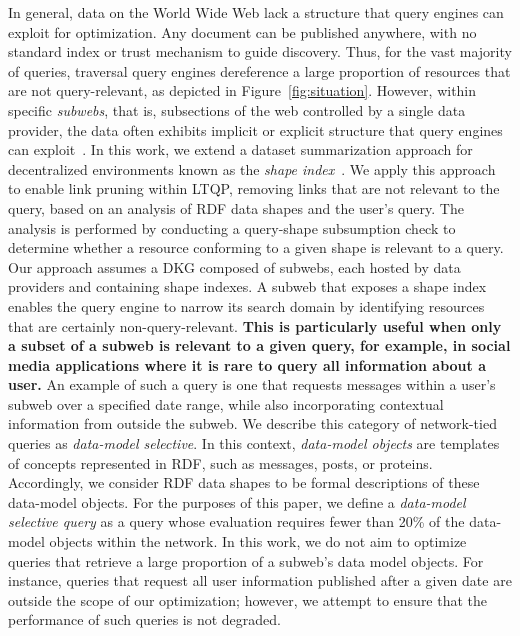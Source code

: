 In general, data on the World Wide Web lack a structure that query engines can exploit for optimization.
Any document can be published anywhere, with no standard index or trust mechanism to guide discovery.
Thus, for the vast majority of queries, traversal query engines dereference a large proportion of resources that are not query-relevant, as depicted in Figure~\ref{fig:situation}.
However, within specific \emph{subwebs}, that is, subsections of the web controlled by a single data provider, the data often exhibits implicit or explicit structure that query engines can exploit~\cite{Bogaerts2021LinkTW}.
In this work, we extend a dataset summarization approach for decentralized environments known as the \emph{shape index}~\cite{tam2024opportunitiesshapebasedoptimizationlink}.
We apply this approach to enable link pruning within \ac{LTQP}, removing links that are not relevant to the query, based on an analysis of \ac{RDF} data shapes and the user's query.
The analysis is performed by conducting a query-shape subsumption check to determine whether a resource conforming to a given shape is relevant to a query.
Our approach assumes a \ac{DKG} composed of subwebs, each hosted by data providers and containing shape indexes.
A subweb that exposes a shape index enables the query engine to narrow its search domain by identifying resources that are certainly non-query-relevant.
\textbf{This is particularly useful when only a subset of a subweb is relevant to a given query, for example, in social media applications where it is rare to query all information about a user.}
An example of such a query is one that requests messages within a user's subweb over a specified date range, while also incorporating contextual information from outside the subweb.
We describe this category of network-tied queries as \emph{data-model selective}.
In this context, \emph{data-model objects} are templates of concepts represented in \ac{RDF},
such as messages, posts, or proteins.
Accordingly, we consider \ac{RDF} data shapes to be formal descriptions of these data-model objects.
For the purposes of this paper, we define a \emph{data-model selective query}
as a query whose evaluation requires fewer than 20\% of the data-model objects within the network.
In this work, we do not aim to optimize queries that retrieve a large proportion of a subweb's data model objects.
For instance, queries that request all user information published after a given date are outside the scope of our optimization; however, we attempt to ensure that the performance of such queries is not degraded.

